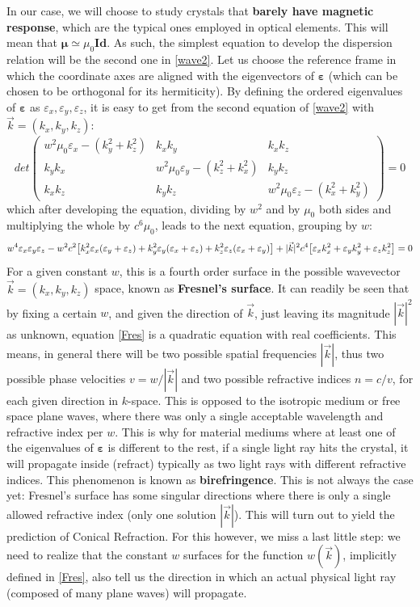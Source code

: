 \documentclass[11pt, a4paper, twoside]{article} %
\begin{document}
In our case, we will choose to study crystals that {\bf barely have magnetic response}, which are the typical ones employed in optical elements. This will mean that $\pmb{\mu}\simeq \mu_0\pmb{Id}$. As such, the simplest equation to develop the dispersion relation will be the second one in \eqref{wave2}. Let us choose the reference frame in which the coordinate axes are aligned with the eigenvectors of $\pmb{\varepsilon}$ (which can be chosen to be orthogonal for its hermiticity). By defining the ordered eigenvalues of $\pmb{\varepsilon}$ as $\varepsilon_x, \varepsilon_y, \varepsilon_z$, it is easy to get from the second equation of \eqref{wave2} with $\vec{k}=(k_x,k_y,k_z)$:
\begin{equation}
det\begin{pmatrix}
w^2\mu_0\varepsilon_x-(k_y^2+k_z^2) & k_xk_y & k_xk_z\\
k_yk_x & w^2\mu_0\varepsilon_y-(k_z^2+k_x^2) & k_yk_z\\
k_xk_z & k_yk_z & w^2\mu_0\varepsilon_z-(k_x^2+k_y^2)
\end{pmatrix}=0
\end{equation}
which after developing the equation, dividing by $w^2$ and by $\mu_0$ both sides and multiplying the whole by $c^6\mu_0$, leads to the next equation, grouping by $w$:
\begin{equation}\label{Fres}
w^4\varepsilon_x\varepsilon_y\varepsilon_z-w^2c^2\qty[k_x^2\varepsilon_x(\varepsilon_y+\varepsilon_z)+k_y^2\varepsilon_y(\varepsilon_x+\varepsilon_z)+k_z^2\varepsilon_z(\varepsilon_x+\varepsilon_y) ]+|\vec{k}|^2c^4\qty[\varepsilon_xk_x^2+\varepsilon_yk_y^2+\varepsilon_zk_z^2]=0
\end{equation}
For a given constant $w$, this is a fourth order surface in the possible wavevector $\vec{k}=(k_x,k_y,k_z)$ space, known as {\bf Fresnel's surface}. It can readily be seen that by fixing a certain $w$, and given the direction of $\vec{k}$, just leaving its magnitude $|\vec{k}|^2$ as unknown, equation \eqref{Fres} is a quadratic equation with real coefficients. This means, in general there will be two possible spatial frequencies $|\vec{k}|$, thus two possible phase velocities $v=w/|\vec{k}|$ and two possible refractive indices $n=c/v$, for each given direction in $k$-space. This is opposed to the isotropic medium or free space plane waves, where there was only a single acceptable wavelength and refractive index per $w$. This is why for material mediums where at least one of the eigenvalues of $\pmb{\varepsilon}$ is different to the rest, if a single light ray hits the crystal, it will propagate inside (refract) typically as two light rays with different refractive indices. This phenomenon is known as {\bf birefringence}. This is not always the case yet: Fresnel's surface has some singular directions where there is only a single allowed refractive index (only one solution $|\vec{k}|$). This will turn out to yield the prediction of Conical Refraction. For this however, we miss a last little step: we need to realize that the constant $w$ surfaces for the function $w(\vec{k})$, implicitly defined in \eqref{Fres}, also tell us the direction in which an actual physical light ray (composed of many plane waves) will propagate.
\end{document}
